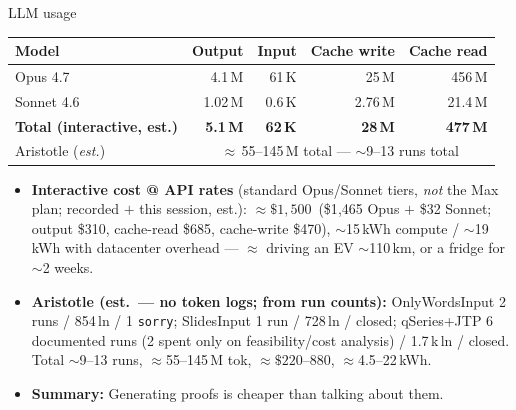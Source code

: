 \documentclass[10pt]{beamer}
\begin{document}
\begin{frame}{LLM usage}
\centering\small
\begin{tabular}{@{}lrrrr@{}}
\toprule
Model & Output & Input & Cache write & Cache read \\
\midrule
Opus 4.7    & 4.1\,M  & 61\,K   & 25\,M   & 456\,M \\
Sonnet 4.6  & 1.02\,M & 0.6\,K  & 2.76\,M & 21.4\,M \\
\midrule
\textbf{Total (interactive, est.)} & \textbf{5.1\,M} & \textbf{62\,K} & \textbf{28\,M} & \textbf{477\,M} \\
\midrule
Aristotle (\emph{est.}) & \multicolumn{4}{c}{$\approx$\,55--145\,M total --- \alert{$\sim$9--13 runs} total} \\
\bottomrule
\end{tabular}
\medskip

\footnotesize
\begin{itemize}
\item \textbf{Interactive cost @ API rates} (standard Opus/Sonnet tiers, \emph{not} the Max plan;
      recorded $+$ this session, est.): $\approx\$1{,}500$ \,(\$1{,}465 Opus $+$ \$32 Sonnet; output \$310,
      cache-read \$685, cache-write \$470), $\sim$15\,kWh compute / $\sim$19\,kWh with datacenter
      overhead --- $\approx$ driving an EV $\sim$110\,km, or a fridge for $\sim$2 weeks.
\item \textbf{Aristotle (est.\ --- no token logs; from run counts):}
      OnlyWordsInput \alert{2 runs} / 854\,ln / 1 \texttt{sorry}; SlidesInput 1 run / 728\,ln / closed;
      qSeries+JTP \alert{6 documented runs} (2 spent only on feasibility/cost analysis) / 1.7\,k\,ln / closed.
      Total $\sim$9--13 runs, $\approx$55--145\,M tok, $\approx\$220$--$880$, $\approx$4.5--22\,kWh.
\item \textbf{Summary:} Generating proofs is cheaper than talking about them.
\end{itemize}
\end{frame}
\end{document}
